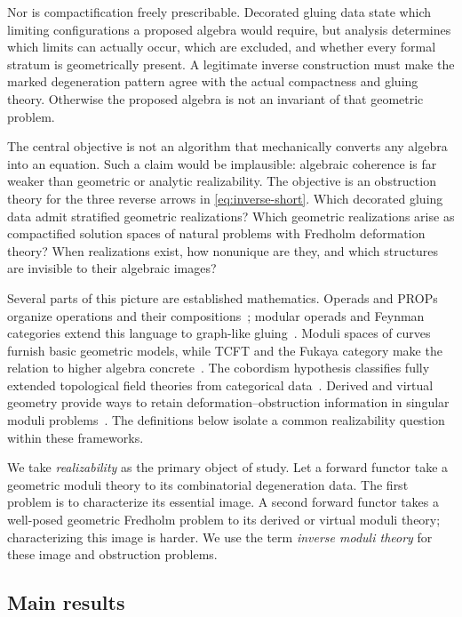 \documentclass[11pt,letterpaper,twoside]{article}
\theoremstyle{plain}
\theoremstyle{definition}
\theoremstyle{remark}
\let\cite\citep
\begin{document}
Nor is compactification freely prescribable.  Decorated gluing data state which limiting configurations a proposed algebra would require, but analysis determines which limits can actually occur, which are excluded, and whether every formal stratum is geometrically present.  A legitimate inverse construction must make the marked degeneration pattern agree with the actual compactness and gluing theory.  Otherwise the proposed algebra is not an invariant of that geometric problem.

The central objective is not an algorithm that mechanically converts any algebra into an equation.  Such a claim would be implausible: algebraic coherence is far weaker than geometric or analytic realizability.  The objective is an obstruction theory for the three reverse arrows in \eqref{eq:inverse-short}.  Which decorated gluing data admit stratified geometric realizations?  Which geometric realizations arise as compactified solution spaces of natural problems with Fredholm deformation theory?  When realizations exist, how nonunique are they, and which structures are invisible to their algebraic images?

Several parts of this picture are established mathematics.  Operads and PROPs organize operations and their compositions~\cite{markl2002}; modular operads and Feynman categories extend this language to graph-like gluing~\cite{getzlerkapranov1998,kaufmannward2017}.  Moduli spaces of curves furnish basic geometric models, while TCFT and the Fukaya category make the relation to higher algebra concrete~\cite{costello2007,fooo2009,seidel2008}.  The cobordism hypothesis classifies fully extended topological field theories from categorical data~\cite{lurietqft}.  Derived and virtual geometry provide ways to retain deformation--obstruction information in singular moduli problems~\cite{pantev2013,joyce2012,polyfold2017}.  The definitions below isolate a common realizability question within these frameworks.

We take \emph{realizability} as the primary object of study.  Let a forward functor take a geometric moduli theory to its combinatorial degeneration data.  The first problem is to characterize its essential image.  A second forward functor takes a well-posed geometric Fredholm problem to its derived or virtual moduli theory; characterizing this image is harder.  We use the term \emph{inverse moduli theory} for these image and obstruction problems.

\subsection{Main results}\label{sec:main-results}
\end{document}
